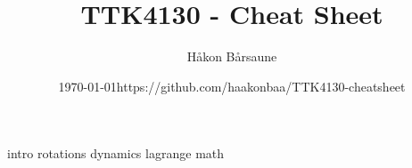 \documentclass{article}
\title{TTK4130 - Cheat Sheet}
\author{Håkon Bårsaune}
\date{\centering\today\endgraf\bigskip https://github.com/haakonbaa/TTK4130-cheatsheet}
\begin{document}
\maketitle

\tableofcontents

\newpage

\begin{multicols}{2}
{intro}
{rotations}
{dynamics}
{lagrange} \newpage
{math}
\end{multicols}
\end{document}
